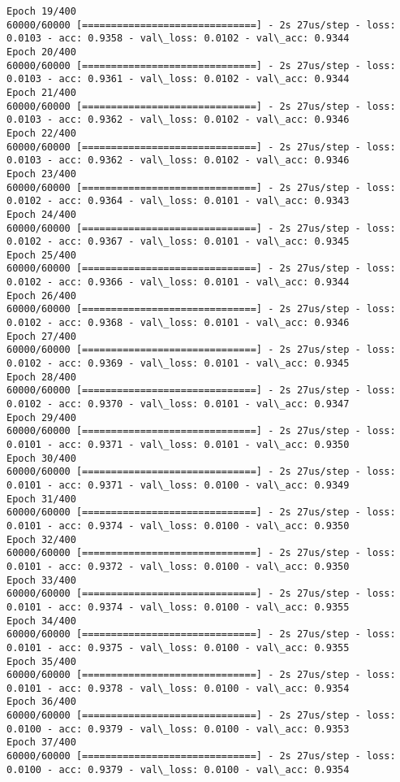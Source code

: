 \documentclass[11pt]{article}
\begin{document}
\begin{Verbatim}[commandchars=\\\{\}]
Epoch 19/400
60000/60000 [==============================] - 2s 27us/step - loss: 0.0103 - acc: 0.9358 - val\_loss: 0.0102 - val\_acc: 0.9344
Epoch 20/400
60000/60000 [==============================] - 2s 27us/step - loss: 0.0103 - acc: 0.9361 - val\_loss: 0.0102 - val\_acc: 0.9344
Epoch 21/400
60000/60000 [==============================] - 2s 27us/step - loss: 0.0103 - acc: 0.9362 - val\_loss: 0.0102 - val\_acc: 0.9346
Epoch 22/400
60000/60000 [==============================] - 2s 27us/step - loss: 0.0103 - acc: 0.9362 - val\_loss: 0.0102 - val\_acc: 0.9346
Epoch 23/400
60000/60000 [==============================] - 2s 27us/step - loss: 0.0102 - acc: 0.9364 - val\_loss: 0.0101 - val\_acc: 0.9343
Epoch 24/400
60000/60000 [==============================] - 2s 27us/step - loss: 0.0102 - acc: 0.9367 - val\_loss: 0.0101 - val\_acc: 0.9345
Epoch 25/400
60000/60000 [==============================] - 2s 27us/step - loss: 0.0102 - acc: 0.9366 - val\_loss: 0.0101 - val\_acc: 0.9344
Epoch 26/400
60000/60000 [==============================] - 2s 27us/step - loss: 0.0102 - acc: 0.9368 - val\_loss: 0.0101 - val\_acc: 0.9346
Epoch 27/400
60000/60000 [==============================] - 2s 27us/step - loss: 0.0102 - acc: 0.9369 - val\_loss: 0.0101 - val\_acc: 0.9345
Epoch 28/400
60000/60000 [==============================] - 2s 27us/step - loss: 0.0102 - acc: 0.9370 - val\_loss: 0.0101 - val\_acc: 0.9347
Epoch 29/400
60000/60000 [==============================] - 2s 27us/step - loss: 0.0101 - acc: 0.9371 - val\_loss: 0.0101 - val\_acc: 0.9350
Epoch 30/400
60000/60000 [==============================] - 2s 27us/step - loss: 0.0101 - acc: 0.9371 - val\_loss: 0.0100 - val\_acc: 0.9349
Epoch 31/400
60000/60000 [==============================] - 2s 27us/step - loss: 0.0101 - acc: 0.9374 - val\_loss: 0.0100 - val\_acc: 0.9350
Epoch 32/400
60000/60000 [==============================] - 2s 27us/step - loss: 0.0101 - acc: 0.9372 - val\_loss: 0.0100 - val\_acc: 0.9350
Epoch 33/400
60000/60000 [==============================] - 2s 27us/step - loss: 0.0101 - acc: 0.9374 - val\_loss: 0.0100 - val\_acc: 0.9355
Epoch 34/400
60000/60000 [==============================] - 2s 27us/step - loss: 0.0101 - acc: 0.9375 - val\_loss: 0.0100 - val\_acc: 0.9355
Epoch 35/400
60000/60000 [==============================] - 2s 27us/step - loss: 0.0101 - acc: 0.9378 - val\_loss: 0.0100 - val\_acc: 0.9354
Epoch 36/400
60000/60000 [==============================] - 2s 27us/step - loss: 0.0100 - acc: 0.9379 - val\_loss: 0.0100 - val\_acc: 0.9353
Epoch 37/400
60000/60000 [==============================] - 2s 27us/step - loss: 0.0100 - acc: 0.9379 - val\_loss: 0.0100 - val\_acc: 0.9354

\end{Verbatim}
\end{document}

